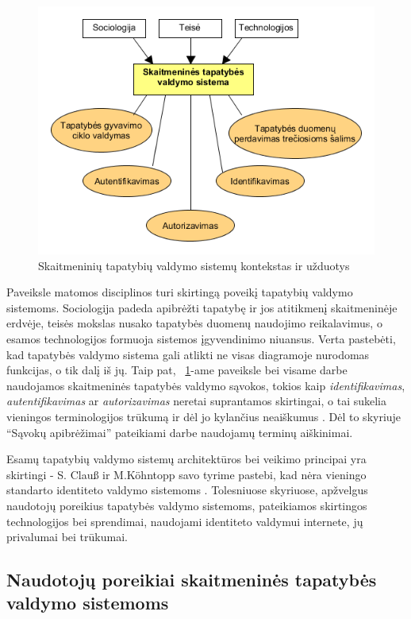 \begin{figure}[H]
    \centering
    \includegraphics[scale=0.8]{img/IDMcontextAndUsecases}
    \caption{Skaitmeninių tapatybių valdymo sistemų kontekstas ir užduotys \cite{Glasser2009}}
    \label{fig:IDMContext}
\end{figure}

Paveiksle matomos disciplinos turi skirtingą poveikį tapatybių valdymo sistemoms. 
Sociologija padeda apibrėžti tapatybę ir jos atitikmenį skaitmeninėje erdvėje, teisės mokslas nusako tapatybės duomenų naudojimo reikalavimus,
o esamos technologijos formuoja sistemos įgyvendinimo niuansus. Verta pastebėti, kad tapatybės valdymo sistema gali atlikti ne visas
diagramoje nurodomas funkcijas, o tik dalį iš jų. Taip pat, ~\ref{fig:IDMContext}-ame paveiksle bei visame darbe naudojamos skaitmeninės tapatybės valdymo sąvokos,
tokios kaip \textit{identifikavimas}, \textit{autentifikavimas} ar \textit{autorizavimas} neretai suprantamos skirtingai, o tai sukelia
vieningos terminologijos trūkumą ir dėl jo kylančius neaiškumus \cite{Glasser2009}. Dėl to skyriuje
\enquote{Sąvokų apibrėžimai} pateikiami darbe naudojamų terminų aiškinimai.

Esamų tapatybių valdymo sistemų architektūros bei veikimo principai yra skirtingi -  S. Clauß ir M.Köhntopp savo tyrime pastebi,
kad nėra vieningo standarto identiteto
valdymo sistemoms \cite{Claus2001}. Tolesniuose skyriuose, apžvelgus naudotojų poreikius
tapatybės valdymo sistemoms, pateikiamos skirtingos technologijos
bei sprendimai, naudojami identiteto valdymui internete, jų privalumai bei trūkumai.

\subsection{Naudotojų poreikiai skaitmeninės tapatybės valdymo sistemoms} \label{section:IDMcharacteristics}

